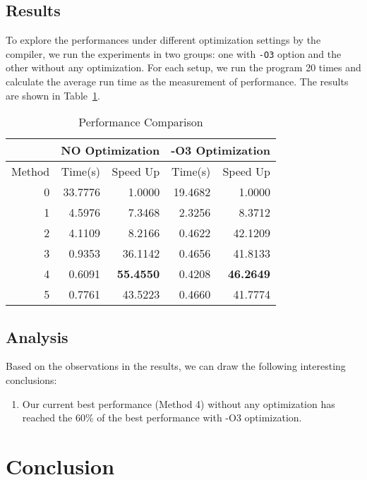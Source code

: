 \documentclass[12pt]{article}
\begin{document}
\subsection{Results}
To explore the performances under different optimization settings by 
the compiler, we run the experiments in two groups: one with 
\texttt{-O3} option and the other without any optimization. For 
each setup, we run the program 20 times and calculate the average 
run time as the measurement of performance. The results are shown in 
Table~\ref{tab:performance}.

\begin{table}[h!]
	\small
	\begin{center}
	\caption{\label{tab:performance} Performance Comparison}
	\begin{tabular}{|r|r|r|r|r|}
		\hline
		 & \multicolumn{2}{c|}{NO Optimization} & \multicolumn{2}{c|}{-O3 Optimization} \\ \hline
		Method & Time(s) & Speed Up & Time(s) & Speed Up \\ \hline
		0  &  33.7776	& 1.0000		&19.4682		&	1.0000 \\ \hline
		1  &		4.5976		&	7.3468		& 2.3256		&	8.3712 \\ \hline
		2  &		4.1109  & 8.2166		&	0.4622		&	42.1209 \\ \hline
		3  &		0.9353  & 36.1142	&	0.4656		&	41.8133 \\ \hline
		4  &		0.6091  & \textbf{55.4550}	& 0.4208		&	\textbf {46.2649} \\ \hline
		5  &		0.7761  & 43.5223	&	0.4660		&	41.7774 \\ \hline
	\end{tabular}
	\end{center}
\end{table}

\subsection{Analysis}
Based on the observations in the results, we can draw the following interesting 
conclusions:
\begin{enumerate}
\item Our current best performance (Method 4) without any optimization has reached 
the 60\% of the best performance with -O3 optimization.
\end{enumerate}

\section{Conclusion}
\end{document}
